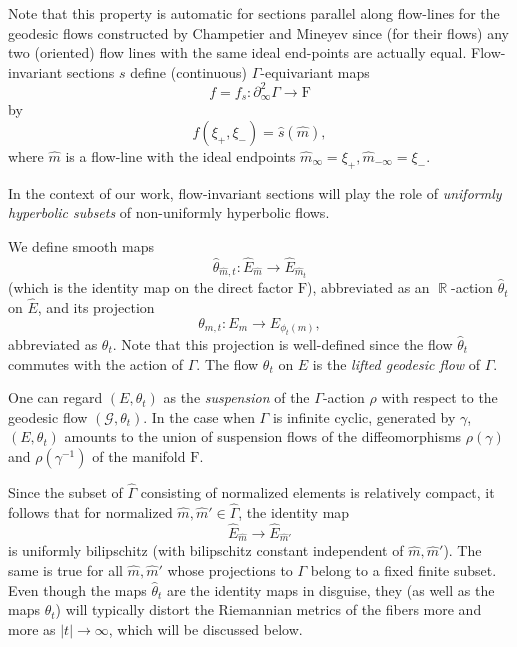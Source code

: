 \documentclass[12pt]{amsbook}%
\theoremstyle{definition}
\theoremstyle{remark}
\numberwithin{section}{chapter}
\numberwithin{subsection}{section}
\numberwithin{figure}{chapter}
\DeclareMathOperator{\R}{\mathbb{R}}
\def\F{\mathrm{F}}
\def\Ga{\Gamma}
\def\ga{\gamma}
\def\geo{\partial_\infty}
\def\cG{{\mathscr{G}}}
\begin{document}
{{Note that this property is automatic for sections parallel along flow-lines  
for the geodesic flows constructed by Champetier and Mineyev
since (for their flows) 
any two (oriented) flow lines with the same ideal end-points 
are actually equal. 
Flow-invariant sections $s$ define (continuous)  $\Ga$-equivariant maps 
\begin{equation*}
f=f_s: \geo^2\Ga\to \F 
\end{equation*}
 by
\begin{equation}
\label{eq:bdmapsect}
f(\xi_+,\xi_-) = \hat{s}(\hat{m}),
\end{equation}
where $\hat m$ is a flow-line with the ideal endpoints $\hat{m}_\infty=\xi_+, \hat{m}_{-\infty}=\xi_-$. 


In the context of our work, flow-invariant sections will play the role of {\em uniformly hyperbolic subsets} of non-uniformly hyperbolic flows.  


We define smooth maps 
$$
\hat\theta_{\hat{m},t}: \widehat{E}_{\hat{m}}\to \widehat{E}_{\hat{m}_t}
$$ 
(which is the identity map on the direct factor $\F$), abbreviated as an $\R$-action $\hat\theta_t$ on $\widehat E$,  
and  its projection
$$
{\theta}_{m,t}: {E}_{m}\to {E}_{\phi_t(m)},
$$
abbreviated as $\theta_t$. Note that this projection is well-defined since the flow $\hat\theta_t$ 
commutes with the action of $\Ga$. 
The flow $\theta_t$ on $E$ is the {\em lifted geodesic flow} of 
$\Ga$. 

One can regard $(E,\theta_t)$ as the {\em suspension} of the $\Ga$-action $\rho$ with respect to the geodesic flow $(\cG,\theta_t)$. In the case 
when $\Ga$ is infinite cyclic, generated by $\ga$, $(E,\theta_t)$ amounts to the union of 
suspension flows of the diffeomorphisms $\rho(\ga)$ and $\rho(\ga^{-1})$ of the manifold $\F$. 

Since the subset of $\widehat\Ga$ consisting of normalized elements is relatively 
compact, it follows that for normalized $\hat m, \hat m'\in \widehat\Ga$, the identity map
$$
\widehat{E}_{\hat m} \to \widehat{E}_{\hat m'}
$$
is uniformly bilipschitz (with bilipschitz constant independent of $\hat m, \hat m'$). The same is true for all 
$\hat m, \hat m'$ whose projections to $\Ga$ belong to a fixed finite subset. Even though the maps $\hat\theta_t$ 
are the identity maps in disguise, they (as well as the maps $\theta_{t}$) 
will typically distort the Riemannian metrics of the fibers more and more as $|t|\to\infty$, 
which will be discussed below.

}}
\end{document}

